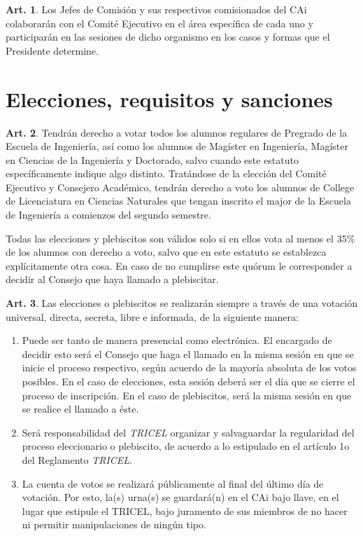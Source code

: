 \documentclass[letterpaper,11pt]{article}
\theoremstyle{definition}%
\newtheorem{art}{Art.} %
\begin{document}
\begin{art}
	Los Jefes de Comisión y sus respectivos comisionados del CAi colaborarán con el Comité Ejecutivo en el área específica de cada uno y participarán en las sesiones de dicho organismo en los casos y formas que el Presidente determine.
\end{art}

\section{Elecciones, requisitos y sanciones}\label{elecciones}

\begin{art}\label{porcentajeMinimo}
	Tendrán derecho a votar todos los alumnos regulares de Pregrado de la Escuela de Ingeniería, así como los alumnos de Magíster en Ingeniería, Magíster en Ciencias de la Ingeniería y Doctorado, salvo cuando este estatuto específicamente indique algo distinto. Tratándose de la elección del Comité Ejecutivo y Consejero Académico, tendrán derecho a voto los alumnos de College de Licenciatura en Ciencias Naturales que tengan inscrito el major de la Escuela de Ingeniería a comienzos del segundo semestre.

	Todas las elecciones y plebiscitos son válidos solo si en ellos vota al menos el 35\% de los alumnos con derecho a voto, salvo que en este estatuto se establezca explícitamente otra cosa. En caso de no cumplirse este quórum le corresponder a decidir al Consejo que haya llamado a plebiscitar.
\end{art}

\begin{art}\label{definicionEleccionesYPlebiscitos}
	Las elecciones o plebiscitos se realizarán siempre a través de una votación universal, directa, secreta, libre e informada, de la siguiente manera:
	\begin{enumerate}
		\item Puede ser tanto de manera presencial como electrónica. El encargado de decidir esto será el Consejo que haga el llamado en la misma sesión en que se inicie el proceso respectivo, según acuerdo de la mayoría absoluta de los votos posibles. En el caso de elecciones, esta sesión deberá ser el día que se cierre el proceso de inscripción. En el caso de plebiscitos, será la misma sesión en que se realice el llamado a éste.
		\item Será responsabilidad del \emph{TRICEL} organizar y salvaguardar la regularidad del proceso eleccionario o plebiscito, de acuerdo a lo estipulado en el artículo 1o del Reglamento \emph{TRICEL}.
		\item La cuenta de votos se realizará públicamente al final del último día de votación. Por esto, la(s) urna(s) se guardará(n) en el CAi bajo llave, en el lugar que estipule el TRICEL, bajo juramento de sus miembros de no hacer ni permitir manipulaciones de ningún tipo.
	\end{enumerate}
\end{art}
\end{document}
